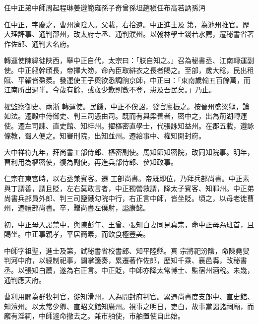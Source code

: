 
\begin{pinyinscope}

 任中正弟中師周起程琳姜遵範雍孫子奇曾孫坦趙稹任布高若訥孫沔



 任中正，字慶之，曹州濟陰人。父載，右拾遺。中正進士及
 第，為池州推官。歷大理評事、通判邵州，改太府寺丞、通判濮州。以翰林學士錢若水薦，遷秘書省著作佐郎、通判大名府。



 轉運使陳緯徙陜西，舉中正自代，太宗曰：「朕自知之。」召為秘書丞、江南轉運副使。中正軀幹頎長，帝擇大笏，命內臣取緋衣之長者賜之。至部，歲大稔，民出租賦、平糴皆盈羨。發運使王子輿欲悉調餉京師，中正曰：「東南歲輸五百餘萬，而江南所出過半。今歲有餘，或歲少歉則數不登，患及吾民矣。」乃止。



 擢監察御史、兩浙
 轉運使。民饑，中正不俟詔，發官廩振之。按晉州盛梁獄，論如法。遷殿中侍御史、判三司憑由司。既而有與梁善者，密中之，出為荊湖轉運使。遷左司諫、直史館、知梓州。擢樞密直學士，代張詠知益州。在郡五載，遵詠條教，蜀人便之。知審刑院，出知並州。遷給事中、權知開封府。



 大中祥符九年，拜尚書工部侍郎、樞密副使。馬知節知密院，改同知院事。明年，曹利用為樞密使，復為副使，再進兵部侍郎、參知政事。



 仁宗在東宮時，以右丞兼賓客。遷
 工部尚書。帝既即位，乃拜兵部尚書。中正素與丁謂善，謂且貶，左右莫敢言者，中正獨營救謂，降太子賓客、知鄆州。中正弟尚書兵部員外郎、判三司鹽鐵勾院中行，右正言中師，皆坐貶。頃之，以母老徙曹州，遷禮部尚書。卒，贈尚書左僕射，謚康懿。



 初，中正母入謁禁中，與陳彭年、王曾、張知白妻同見真宗，命中正母為班首，且賜坐。中正事親孝，平居簡素，而飲食極豐美。



 中師字祖聖，進士及第，試秘書省校書郎、知平陸縣。真
 宗將祀汾陰，命陳堯叟判河中府，以經制祀事，闢掌箋奏，累遷著作佐郎，歷知千乘、襄邑縣，改秘書丞。以張知白薦，遂為右正言。中正貶，中師亦降太常博士、監宿州酒稅。未幾，通判應天府。



 曹利用闢為群牧判官，徙知滑州，入為開封府判官。累遷尚書度支郎中、直史館、知澶州。以太常少卿、直昭文館知廣州。視事之明日，吏白，故事當謁諸祠廟，而廨有淫祠，中師遽命撤去之。兼市舶使，市舶置使自此始。




\end{pinyinscope}
